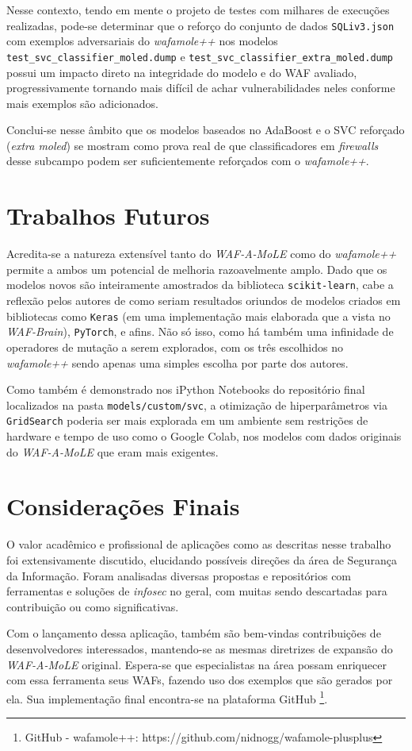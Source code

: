 Nesse contexto, tendo em mente o projeto de testes com milhares de execuções realizadas, pode-se determinar que o reforço do conjunto de dados \verb+SQLiv3.json+ com exemplos adversariais do \textit{wafamole++} nos modelos \verb+test_svc_classifier_moled.dump+ e \linebreak \verb+test_svc_classifier_extra_moled.dump+ possui um impacto direto na integridade do modelo e do WAF avaliado, progressivamente tornando mais difícil de achar vulnerabilidades neles conforme mais exemplos são adicionados.

Conclui-se nesse âmbito que os modelos baseados no AdaBoost e o SVC reforçado (\textit{extra moled}) se mostram como prova real de que classificadores em \textit{firewalls} desse subcampo podem ser suficientemente reforçados com o \textit{wafamole++}.


\section{Trabalhos Futuros}
Acredita-se a natureza extensível tanto do \textit{WAF-A-MoLE} como do \textit{wafamole++} permite a ambos um potencial de melhoria razoavelmente amplo. Dado que os modelos novos são inteiramente amostrados da biblioteca \verb+scikit-learn+, cabe a reflexão pelos autores de como seriam resultados oriundos de modelos criados em bibliotecas como \verb+Keras+ (em uma implementação mais elaborada que a vista no \textit{WAF-Brain}), \verb+PyTorch+, e afins. Não só isso, como há também uma infinidade de operadores de mutação a serem explorados, com os três escolhidos no \textit{wafamole++} sendo apenas uma simples escolha por parte dos autores.

Como também é demonstrado nos iPython Notebooks do repositório final localizados na pasta \verb+models/custom/svc+, a otimização de hiperparâmetros via \verb+GridSearch+ poderia ser mais explorada em um ambiente sem restrições de hardware e tempo de uso como o Google Colab, nos modelos com dados originais do \textit{WAF-A-MoLE} que eram mais exigentes. 

\section{Considerações Finais}
O valor acadêmico e profissional de aplicações como as descritas nesse trabalho foi extensivamente discutido, elucidando possíveis direções da área de Segurança da Informação. Foram analisadas diversas propostas e repositórios com ferramentas e soluções de \textit{infosec} no geral, com muitas sendo descartadas para contribuição ou como significativas. 

Com o lançamento dessa aplicação, também são bem-vindas contribuições de desenvolvedores interessados, mantendo-se as mesmas diretrizes de expansão do \textit{WAF-A-MoLE} original. Espera-se que especialistas na área possam enriquecer com essa ferramenta seus WAFs, fazendo uso dos exemplos que são gerados por ela. Sua implementação final encontra-se na plataforma GitHub \footnote{GitHub - wafamole++:  https://github.com/nidnogg/wafamole-plusplus}.

